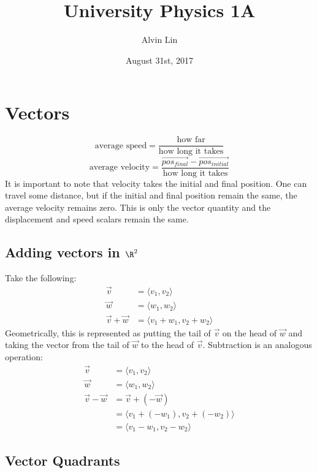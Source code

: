 \documentclass[letterpaper, 12pt]{math}
\title{University Physics 1A}
\author{Alvin Lin}
\date{August 31st, 2017}
\begin{document}
\maketitle

\section*{Vectors}
\[ \textrm{average speed} =
  \frac{\textrm{how far}}{\textrm{how long it takes}} \]
\[ \textrm{average velocity} =
  \frac{\vec{pos_{final}}-\vec{pos_{initial}}}
  {\textrm{how long it takes}} \]
It is important to note that velocity takes the initial and final
position. One can travel some distance, but if the initial and final
position remain the same, the average velocity remains zero. This is
only the vector quantity and the displacement and speed scalars remain
the same.

\subsection*{Adding vectors in \( \R^{2} \)}
Take the following:
\begin{align*}
  \vec{v} &= \langle v_{1},v_{2}\rangle \\
  \vec{w} &= \langle w_{1},w_{2}\rangle \\
  \vec{v}+\vec{w} &= \langle v_{1}+w_{1},v_{2}+w_{2}\rangle
\end{align*}
Geometrically, this is represented as putting the tail of
\( \vec{v} \) on the head of \( \vec{w} \) and taking the vector
from the tail of \( \vec{w} \) to the head of \( \vec{v} \).
Subtraction is an analogous operation:
\begin{align*}
  \vec{v} &= \langle v_{1},v_{2}\rangle \\
  \vec{w} &= \langle w_{1},w_{2}\rangle \\
  \vec{v}-\vec{w} &= \vec{v}+(-\vec{w}) \\
  &= \langle v_{1}+(-w_{1}),v_{2}+(-w_{2})\rangle \\
  &= \langle v_{1}-w_{1},v_{2}-w_{2}\rangle
\end{align*}

\subsection*{Vector Quadrants}
\begin{center}
\end{center}
\end{document}
